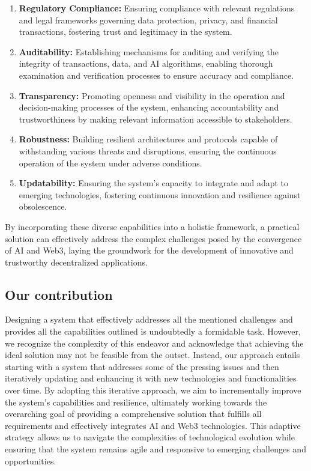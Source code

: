 \documentclass[conference]{IEEEtran}
\begin{document}
\begin{enumerate}
    \item \textbf{Regulatory Compliance:} Ensuring compliance with relevant regulations and legal frameworks governing data protection, privacy, and financial transactions, fostering trust and legitimacy in the system.

    \item \textbf{Auditability:} Establishing mechanisms for auditing and verifying the integrity of transactions, data, and AI algorithms, enabling thorough examination and verification processes to ensure accuracy and compliance.

    \item \textbf{Transparency:} Promoting openness and visibility in the operation and decision-making processes of the system, enhancing accountability and trustworthiness by making relevant information accessible to stakeholders.

    \item \textbf{Robustness:} Building resilient architectures and protocols capable of withstanding various threats and disruptions, ensuring the continuous operation of the system under adverse conditions.

    \item \textbf{Updatability:} Ensuring the system's capacity to integrate and adapt to emerging technologies, fostering continuous innovation and resilience against obsolescence.

\end{enumerate}

By incorporating these diverse capabilities into a holistic framework, a practical solution can effectively address the complex challenges posed by the convergence of AI and Web3, laying the groundwork for the development of innovative and trustworthy decentralized applications.

\subsection{Our contribution}

Designing a system that effectively addresses all the mentioned challenges and provides all the capabilities outlined is undoubtedly a formidable task. However, we recognize the complexity of this endeavor and acknowledge that achieving the ideal solution may not be feasible from the outset. Instead, our approach entails starting with a system that addresses some of the pressing issues and then iteratively updating and enhancing it with new technologies and functionalities over time. By adopting this iterative approach, we aim to incrementally improve the system's capabilities and resilience, ultimately working towards the overarching goal of providing a comprehensive solution that fulfills all requirements and effectively integrates AI and Web3 technologies. This adaptive strategy allows us to navigate the complexities of technological evolution while ensuring that the system remains agile and responsive to emerging challenges and opportunities.
\end{document}
